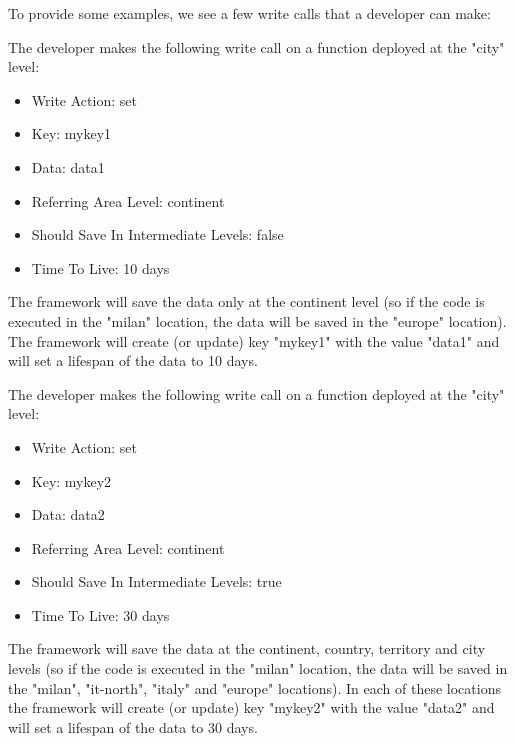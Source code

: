 To provide some examples, we see a few write calls that a developer can make:

\begin{example}
The developer makes the following write call on a function deployed at the "city" level:
\begin{itemize}
    \item Write Action: set
    \item Key: mykey1
    \item Data: data1
    \item Referring Area Level: continent
    \item Should Save In Intermediate Levels: false
    \item Time To Live: 10 days
\end{itemize}
The framework will save the data only at the continent level (so if the code is executed in the "milan" location, the data will be saved in the "europe" location). The framework will create (or update) key "mykey1" with the value "data1" and will set a lifespan of the data to 10 days.
\end{example}

\begin{example}
The developer makes the following write call on a function deployed at the "city" level:
\begin{itemize}
    \item Write Action: set
    \item Key: mykey2
    \item Data: data2
    \item Referring Area Level: continent
    \item Should Save In Intermediate Levels: true
    \item Time To Live: 30 days
\end{itemize}
The framework will save the data at the continent, country, territory and city levels (so if the code is executed in the "milan" location, the data will be saved in the "milan", "it-north", "italy" and "europe" locations). In each of these locations the framework will create (or update) key "mykey2" with the value "data2" and will set a lifespan of the data to 30 days.
\end{example}

